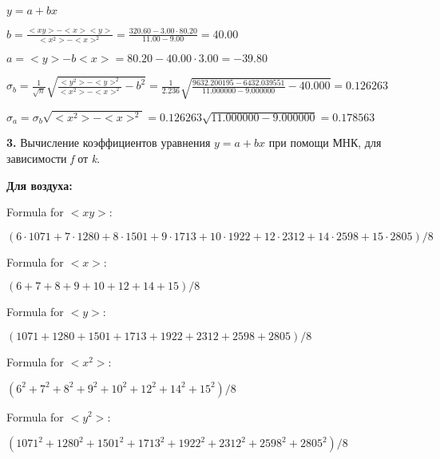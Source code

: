 \documentclass[12pt,a4paper]{article}
\begin{document}
$y = a + bx$
\vspace{0.5cm}

$b = \frac{<xy> - <x><y>}{<x^2> - <x>^2} = \frac{320.60 - 3.00 \cdot 80.20}{11.00 - 9.00} = 40.00$
\vspace{0.5cm}

$a =<y> - b<x> = 80.20 - 40.00 \cdot 3.00 = -39.80$
\vspace{0.5cm}

$\sigma_b = \frac{1}{\sqrt{n}} \sqrt { \frac{<y^2> - <y>^2}{<x^2> - <x>^2}  - b^2} = \frac{1}{2.236} \sqrt {\frac{9632.200195 - 6432.039551}{11.000000 - 9.000000} - 40.000} = 0.126263$
\vspace{0.5cm}

$\sigma_a = \sigma_b \sqrt{<x^2> - <x>^2} = 0.126263 \sqrt{11.000000 - 9.000000} = 0.178563$
\vspace{0.5cm}

\textbf{3.} Вычисление коэффициентов уравнения $y = a + bx$ при помощи МНК, для зависимости \textit{f} от \textit{k}.

\vspace{0.5cm}

\textbf{Для воздуха:}
\vspace{0.5cm}

Formula for $<xy>:$
\vspace{0.5cm}

$(6 \cdot 1071 + 7 \cdot 1280 + 8 \cdot 1501 + 9 \cdot 1713 + 10 \cdot 1922 + 12 \cdot 2312 + 14 \cdot 2598 + 15 \cdot 2805) / 8$
\vspace{0.5cm}

Formula for $<x>:$
\vspace{0.5cm}

$(6 + 7 + 8 + 9 + 10 + 12 + 14 + 15) / 8$
\vspace{0.5cm}

Formula for $<y>:$
\vspace{0.5cm}

$(1071 + 1280 + 1501 + 1713 + 1922 + 2312 + 2598 + 2805) / 8$
\vspace{0.5cm}

Formula for $<x^2>$:
\vspace{0.5cm}

$(6^2 + 7^2 + 8^2 + 9^2 + 10^2 + 12^2 + 14^2 + 15^2) / 8$
\vspace{0.5cm}

Formula for $<y^2>:$
\vspace{0.5cm}

$(1071^2 + 1280^2 + 1501^2 + 1713^2 + 1922^2 + 2312^2 + 2598^2 + 2805^2) / 8$
\vspace{0.5cm}
\end{document}
